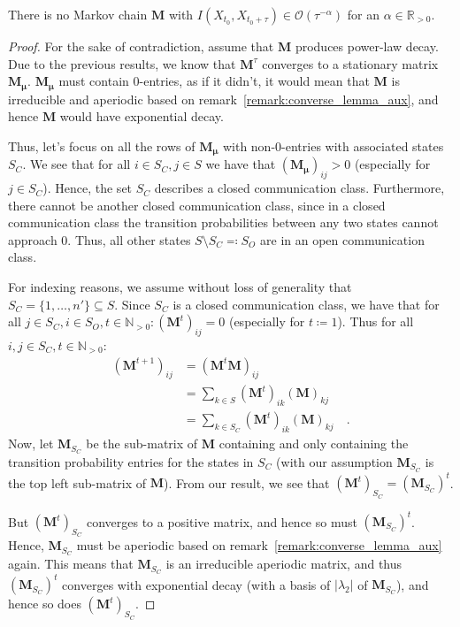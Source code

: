 \documentclass[../../main.tex]{subfiles}
\begin{document}
    \begin{theorem}
        There is no Markov chain $\bm{M}$ with $I(X_{t_0}, X_{t_0 + \tau}) \in \mathcal{O}(\tau^{-\alpha})$ for an $\alpha \in \mathbb{R}_{>0}$.
    \end{theorem}
    \vspace{-2.5em}
    \begin{proof}
        For the sake of contradiction, assume that $\bm{M}$ produces power-law decay. Due to the previous results, we know that $\bm{M}^\tau$ converges to a stationary matrix $\bm{M_\mu}$. $\bm{M_\mu}$ must contain 0-entries, as if it didn't, it would mean that $\bm{M}$ is irreducible and aperiodic based on remark~\ref{remark:converse_lemma_aux}, and hence $\bm{M}$ would have exponential decay.

        Thus, let's focus on all the rows of $\bm{M_\mu}$ with non-0-entries with associated states $S_C$. We see that for all $i \in S_C, j \in S$ we have that $(\bm{M_\mu})_{ij} > 0$ (especially for $j \in S_C$). Hence, the set $S_C$ describes a closed communication class. Furthermore, there cannot be another closed communication class, since in a closed communication class the transition probabilities between any two states cannot approach 0. Thus, all other states $S \setminus S_C \eqqcolon S_O$ are in an open communication class.
        
        For indexing reasons, we assume without loss of generality that $S_C = \{ 1, \dots, n' \} \subseteq S$.
        Since $S_C$ is a closed communication class, we have that for all $j \in S_C, i \in S_O, t \in \mathbb{N}_{>0}: (\bm{M}^t)_{ij} = 0$ (especially for $t \coloneqq 1$). Thus for all $i,j \in S_C, t \in \mathbb{N}_{>0}$:
        \begin{align*}   
            (\bm{M}^{t+1})_{ij} &= (\bm{M}^t \bm{M})_{ij} \\
            &= \sum_{k \in S} (\bm{M}^t)_{ik} (\bm{M})_{kj} \\
            &= \sum_{k \in S_C} (\bm{M}^t)_{ik} (\bm{M})_{kj} \quad .
        \end{align*}
        Now, let $\bm{M}_{S_C}$ be the sub-matrix of $\bm{M}$ containing and only containing the transition probability entries for the states in $S_C$ (with our assumption $\bm{M}_{S_C}$ is the top left sub-matrix of $\bm{M}$). From our result, we see that $(\bm{M}^t)_{S_C} = (\bm{M}_{S_C})^t$.

        But $(\bm{M}^t)_{S_C}$ converges to a positive matrix, and hence so must $(\bm{M}_{S_C})^t$. Hence, $\bm{M}_{S_C}$ must be aperiodic based on remark~\ref{remark:converse_lemma_aux} again. This means that $\bm{M}_{S_C}$ is an irreducible aperiodic matrix, and thus $(\bm{M}_{S_C})^t$ converges with exponential decay (with a basis of $|\lambda_2|$ of $\bm{M}_{S_C}$), and hence so does $(\bm{M}^t)_{S_C}$.


\end{proof}
\end{document}
